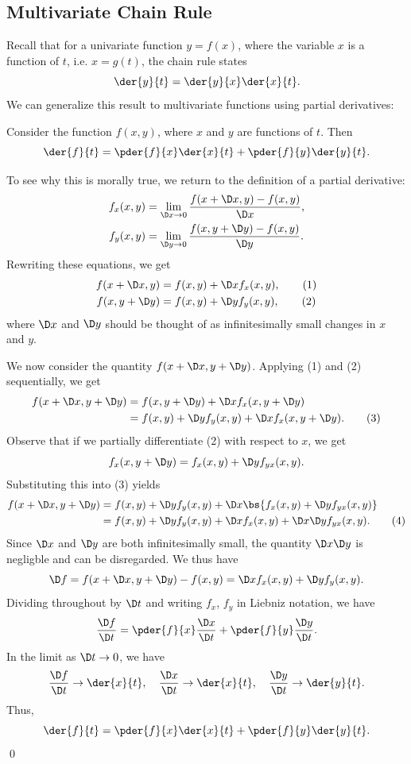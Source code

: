 \subsection{Multivariate Chain Rule}\label{subsec:Multivariate-Chain-Rule}

Recall that for a univariate function $y = f(x)$, where the variable $x$ is a function of $t$, i.e. $x = g(t)$, the chain rule states \[\der{y}{t} = \der{y}{x} \der{x}{t}.\] We can generalize this result to multivariate functions using partial derivatives:

\begin{proposition}
    Consider the function $f(x, y)$, where $x$ and $y$ are functions of $t$. Then \[\der{f}{t} = \pder{f}{x} \der{x}{t} + \pder{f}{y} \der{y}{t}.\]
\end{proposition}

To see why this is morally true, we return to the definition of a partial derivative:
\begin{align*}
    f_x(x, y) &= \lim_{\D x \to 0} \frac{f(x + \D x, y) - f(x, y)}{\D x},\\
    f_y(x, y) &= \lim_{\D y \to 0} \frac{f(x, y + \D y) - f(x, y)}{\D y}.
\end{align*}
Rewriting these equations, we get
\begin{align*}
    f(x + \D x, y) &= f(x, y) + \D x f_x(x, y), \tag{1}\\
    f(x, y + \D y) &= f(x, y) + \D y f_y(x, y), \tag{2}
\end{align*}
where $\D x$ and $\D y$ should be thought of as infinitesimally small changes in $x$ and $y$.

We now consider the quantity $f(x + \D x, y + \D y)$. Applying (1) and (2) sequentially, we get
\begin{align*}
    f(x + \D x, y + \D y) &= f(x, y + \D y) + \D x f_x(x, y + \D y)\\
    &= f(x, y) + \D y f_y(x,y) + \D x f_x(x, y + \D y). \tag{3}
\end{align*}
Observe that if we partially differentiate (2) with respect to $x$, we get \[f_x(x, y + \D y) = f_x(x, y) + \D y f_{yx}(x, y).\] Substituting this into (3) yields
\begin{align*}
    f(x + \D x, y + \D y) &= f(x, y) + \D y f_y(x,y) + \D x \bs{f_x(x, y) + \D y f_{yx}(x, y)}\\
    &= f(x, y) + \D y f_y(x,y) + \D x f_x(x, y) + \D x\D y f_{yx}(x, y). \tag{4}
\end{align*}
Since $\D x$ and $\D y$ are both infinitesimally small, the quantity $\D x \D y$ is negligble and can be disregarded. We thus have \[\D f = f(x + \D x, y + \D y) - f(x, y) = \D x f_x(x, y) + \D y f_y(x,y).\] Dividing throughout by $\D t$ and writing $f_x$, $f_y$ in Liebniz notation, we have \[\frac{\D f}{\D t} = \pder{f}{x} \frac{\D x}{\D t} + \pder{f}{y} \frac{\D y}{\D t}.\] In the limit as $\D t \to 0$, we have \[\frac{\D f}{\D t} \to \der{x}{t}, \quad \frac{\D x}{\D t} \to \der{x}{t}, \quad \frac{\D y}{\D t} \to \der{y}{t}.\] Thus, \[\der{f}{t} = \pder{f}{x} \der{x}{t} + \pder{f}{y} \der{y}{t}.\] \qed

